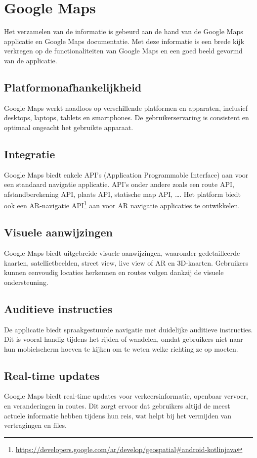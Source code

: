 \section{Google Maps}
\label{sec:google maps}

Het verzamelen van de informatie is gebeurd aan de hand van de Google Maps applicatie en Google Maps documentatie. Met deze informatie is een brede kijk verkregen op de functionaliteiten van Google Maps en een goed beeld gevormd van de applicatie.

\subsection*{Platformonafhankelijkheid}
Google Maps werkt naadloos op verschillende platformen en apparaten, inclusief desktops, laptops, tablets en smartphones. De gebruikerservaring is consistent en optimaal ongeacht het gebruikte apparaat.

\subsection*{Integratie}
Google Maps biedt enkele API's (Application Programmable Interface) aan voor een standaard navigatie applicatie. API's onder andere zoals een route API, afstandberekening API, plaats API, statische map API, \ldots . Het platform biedt ook een AR-navigatie API\footnote{\url{https://developers.google.com/ar/develop/geospatial#android-kotlinjava}} aan voor AR navigatie applicaties te ontwikkelen.

\subsection*{Visuele aanwijzingen}
Google Maps biedt uitgebreide visuele aanwijzingen, waaronder gedetailleerde kaarten, satellietbeelden, street view, live view of AR en 3D-kaarten. Gebruikers kunnen eenvoudig locaties herkennen en routes volgen dankzij de visuele ondersteuning.

\subsection*{Auditieve instructies}
De applicatie biedt spraakgestuurde navigatie met duidelijke auditieve instructies. Dit is vooral handig tijdens het rijden of wandelen, omdat gebruikers niet naar hun mobielscherm hoeven te kijken om te weten welke richting ze op moeten.

\subsection*{Real-time updates}
Google Maps biedt real-time updates voor verkeersinformatie, openbaar vervoer, en veranderingen in routes. Dit zorgt ervoor dat gebruikers altijd de meest actuele informatie hebben tijdens hun reis, wat helpt bij het vermijden van vertragingen en files.


